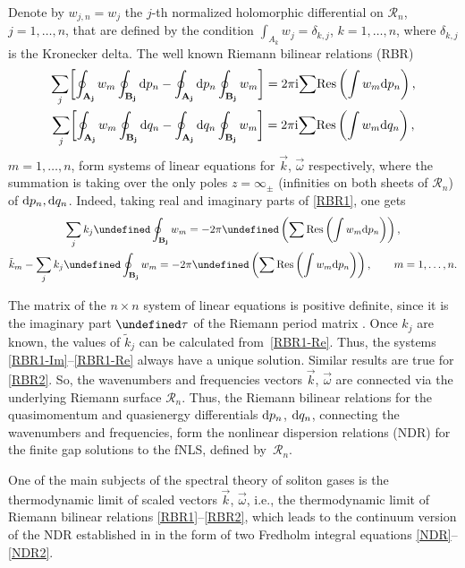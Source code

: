 \documentclass[10pt,a4paper]{amsart}
\numberwithin{equation}{section}
\let\Re\undefined
\let\Im\undefined
\DeclareMathOperator{\Re}{Re}
\DeclareMathOperator{\Im}{Im}
\renewcommand{\d}{\delta}
\renewcommand{\o}{\omega}
\def\Rscr{\mathcal{R}}
\def\o{\omega}
\def\d{\delta}
\def\tk{\tilde k}
\begin{document}
Denote by $w_{j,n}=w_j$ the $j$-th normalized holomorphic differential on $\Rscr_n$, $j=1,\dots,n$, that are defined by the condition $\int_{A_k}w_j =\d_{k,j}$, $k=1,\dots,n$, where $\d_{k,j}$ is the Kronecker delta. The well known Riemann bilinear relations (RBR)
\begin{gather}
\sum_j\biggl[\oint_{\bf A_j}w_m\oint_{\bf B_j}{\rm d}p_n-\oint_{\bf A_j}{\rm d}p_n\oint_{\bf B_j}w_m\biggr]=2\pi {\rm i} {\sum} {\rm Res}\left(\int w_m {\rm d}p_n\right), \label{RBR1}\\
\sum_j\biggl[\oint_{\bf A_j}w_m\oint_{\bf B_j}{\rm d}q_n-\oint_{\bf A_j}{\rm d}q_n\oint_{\bf B_j}w_m\biggr]=2\pi {\rm i} {\sum} {\rm Res}\left(\int w_m {\rm d}q_n\right),
\label{RBR2}
\end{gather}
$m=1,\dots,n$, form systems of linear equations for $\vec k$, $\vec \o$ respectively, where the summation is taking over the only poles $z=\infty_\pm$ (infinities on both sheets of $\Rscr_n$) of ${\rm d}p_n,{\rm d}q_n$. Indeed,
taking real and imaginary parts of \eqref{RBR1}, one gets
 \begin{gather}
\sum_j k_j \Im \oint_{\bf B_j}w_m=-2\pi \Re\left( \sum {\rm Res}\left(\int w_m {\rm d}p_n\right) \right), \label{RBR1-Im} \\
\tk_m - \sum_j k_j \Re \oint_{\bf B_j}w_m=-2\pi \Im\left( \sum {\rm Res}\left(\int w_m {\rm d}p_n\right) \right),\qquad m=1,\dots,n.
\label{RBR1-Re}
\end{gather}

The matrix of the $n\times n$ system of linear equations is positive definite, since it is the imaginary part $\Im \tau$ of the Riemann period matrix . Once $k_j$ are known, the values of $\tk_j$ can be calculated from~\eqref{RBR1-Re}.
Thus, the systems \eqref{RBR1-Im}--\eqref{RBR1-Re} always have a unique solution.
Similar results are true for \eqref{RBR2}.
So, the wavenumbers and frequencies vectors $\vec k$, $\vec \o$ are connected via the underlying Riemann surface $\Rscr_n$. Thus, the Riemann bilinear relations for the quasimomentum and quasienergy differentials ${\rm d}p_n$, ${\rm d}q_n$, connecting the wavenumbers and frequencies, form the nonlinear dispersion relations (NDR) for the finite gap solutions to the fNLS, defined by~$\Rscr_n$.

One of the main subjects of the spectral theory of soliton gases is the thermodynamic limit of scaled vectors $\vec k$, $\vec\o$, i.e., the thermodynamic limit of Riemann bilinear relations \eqref{RBR1}--\eqref{RBR2}, which leads to the continuum version of the NDR established in \cite{ET2020} in the form of two Fredholm integral equations \eqref{NDR}--\eqref{NDR2}.
\end{document}
